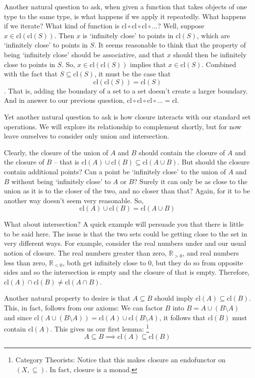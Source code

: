 \documentclass{report}
\newcommand{\cl}{\mathrm{cl}}
\begin{document}
Another natural question to ask, when given a function that takes objects of one type to the same type, is what happens if we apply it repeatedly. What happens if we iterate? What kind of function is $\cl ∘ \cl ∘ \cl ∘ ...$? Well, suppose $x ∈ \cl(\cl(S))$. Then $x$ is `infinitely close' to points in $\cl(S)$, which are `infinitely close' to points in $S$. It seems reasonable to think that the property of being `infinitely close' should be associative, and that $x$ should then be infinitely close to points in $S$. So, $x ∈ \cl(\cl(S))$ implies that $x ∈ \cl(S)$. Combined with the fact that $S ⊆ \cl(S)$, it must be the case that 
\begin{equation}
\cl(\cl(S)) = \cl(S) \tag{Closure 3}
\end{equation}
. That is, adding the boundary of a set to a set doesn't create a larger boundary. And in answer to our previous question, $\cl ∘ \cl ∘ \cl ∘ ... = \cl$.

Yet another natural question to ask is how closure interacts with our standard set operations. We will explore its relationship to complement shortly, but for now leave ourselves to consider only union and intersection.

Clearly, the closure of the union of $A$ and $B$ should contain the closure of $A$ and the closure of $B$ -- that is $\cl(A)∪\cl(B) ⊆ \cl(A∪B)$. But should the closure contain additional points? Can a point be `infinitely close' to the union of $A$ and $B$ without being `infinitely close' to $A$ or $B$? Surely it can only be as close to the union as it is to the closer of the two, and no closer than that? Again, for it to be another way doesn't seem very reasonable. So, 
\begin{equation}
\cl(A)∪\cl(B) = \cl(A∪B) \tag{Closure 4}
\end{equation}

What about intersection? A quick example will persuade you that there is little to be said here. The issue is that the two sets could be getting close to the set in very different ways. For example, consider the real numbers under and our usual notion of closure. The real numbers greater than zero, $ℝ_{>0}$, and real numbers less than zero, $ℝ_{<0}$, both get infinitely close to $0$, but they do so from opposite sides and so the intersection is empty and the closure of that is empty. Therefore, $\cl(A)∩\cl(B) ≠ \cl(A∩B)$.

Another natural property to desire is that $A ⊆ B$ should imply $\cl(A) ⊆ \cl(B)$. This, in fact, follows from our axioms: We can factor $B$ into $B = A∪(B\setminus A)$ and since $\cl(A∪(B\setminus A)) = \cl(A)∪\cl(B\setminus A)$, it follows that $\cl(B)$ must contain $\cl(A)$. This gives us our first lemma:
\footnote{Category Theorists: Notice that this makes closure an endofunctor on $(X, ⊆)$. In fact, closure is a monad.}
\begin{equation}
A ⊆ B   \implies   \cl(A) ⊆ \cl(B)   \tag{Lemma 1}
\end{equation}
  
\end{document}
